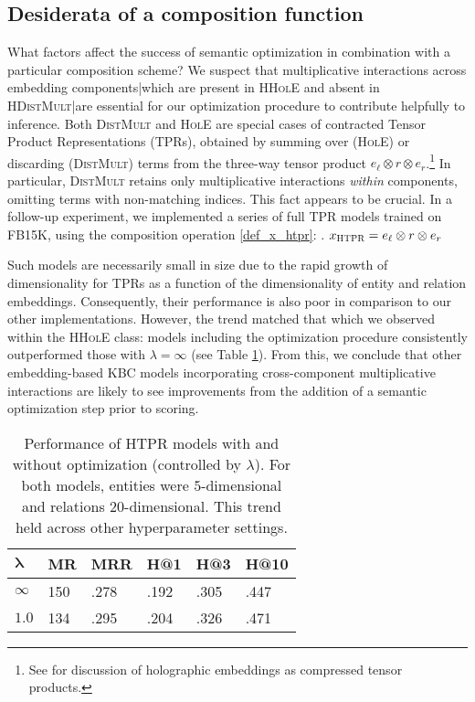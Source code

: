 \documentclass[a4paper,10pt]{article}
\begin{document}
\subsection{Desiderata of a composition function}
What factors affect the success of semantic optimization in combination with a particular composition scheme? We suspect that multiplicative interactions across embedding components|which are present in \textsc{HHolE} and absent in \textsc{HDistMult}|are essential for our optimization procedure to contribute helpfully to inference. Both \textsc{DistMult} and \textsc{HolE} are special cases of contracted Tensor Product Representations (\textsc{TPR}s), obtained by summing over (\textsc{HolE}) or discarding (\textsc{DistMult}) terms from the three-way tensor product $e_\ell \otimes r \otimes e_r$.\footnote{See \citep{nickel2016hole} for discussion of holographic embeddings as compressed tensor products.} In particular, \textsc{DistMult} retains only multiplicative interactions \emph{within} components, omitting terms with non-matching indices. This fact appears to be crucial. In a follow-up experiment, we implemented a series of full \textsc{TPR} models trained on FB15K, using the composition operation \ref{def_x_htpr}:
\ex. $x_{\textsc{HTPR}} = e_\ell \otimes r \otimes e_r$ 	\label{def_x_htpr}

Such models are necessarily small in size due to the rapid growth of dimensionality for \textsc{TPR}s as a function of the dimensionality of entity and relation embeddings. Consequently, their performance is also poor in comparison to our other implementations. However, the trend matched that which we observed within the \textsc{HHolE} class: models including the optimization procedure consistently outperformed those with $\lambda=\infty$ (see Table \ref{table_HTPR_results}). From this, we conclude that other embedding-based KBC models incorporating cross-component multiplicative interactions are likely to see improvements from the addition of a semantic optimization step prior to scoring.
\begin{table}
\begin{tabular}{l||l|l|l|l|l}
$\mathbf{\lambda}$ & \textbf{MR} & \textbf{MRR} & \textbf{H@1} & \textbf{H@3} & \textbf{H@10} \\\hline \hline
$\infty$ & 150 & .278 & .192 & .305 & .447	\\
$1.0$ & 134 & .295 & .204 & .326 & .471
\end{tabular}
\caption{Performance of \textsc{HTPR} models with and without optimization (controlled by $\lambda$). For both models, entities were $5$-dimensional and relations $20$-dimensional. This trend held across other hyperparameter settings.} \label{table_HTPR_results}
\end{table}
\end{document}
